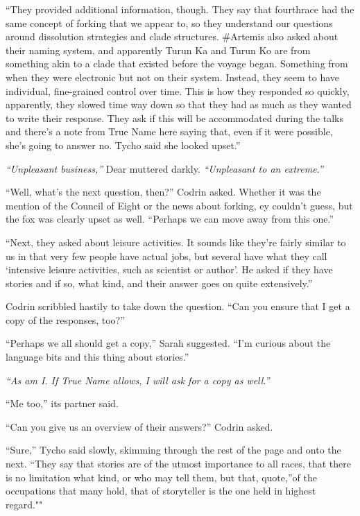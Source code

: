 ``They provided additional information, though. They say that fourthrace had the same concept of forking that we appear to, so they understand our questions around dissolution strategies and clade structures. \#Artemis also asked about their naming system, and apparently Turun Ka and Turun Ko are from something akin to a clade that existed before the voyage began. Something from when they were electronic but not on their system. Instead, they seem to have individual, fine-grained control over time. This is how they responded so quickly, apparently, they slowed time way down so that they had as much as they wanted to write their response. They ask if this will be accommodated during the talks and there's a note from True Name here saying that, even if it were possible, she's going to answer no. Tycho said she looked upset.''

\emph{``Unpleasant business,''} Dear muttered darkly. \emph{``Unpleasant to an extreme.''}

``Well, what's the next question, then?'' Codrin asked. Whether it was the mention of the Council of Eight or the news about forking, ey couldn't guess, but the fox was clearly upset as well. ``Perhaps we can move away from this one.''

``Next, they asked about leisure activities. It sounds like they're fairly similar to us in that very few people have actual jobs, but several have what they call `intensive leisure activities, such as scientist or author'. He asked if they have stories and if so, what kind, and their answer goes on quite extensively.''

Codrin scribbled hastily to take down the question. ``Can you ensure that I get a copy of the responses, too?''

``Perhaps we all should get a copy,'' Sarah suggested. ``I'm curious about the language bits and this thing about stories.''

\emph{``As am I. If True Name allows, I will ask for a copy as well.''}

``Me too,'' its partner said.

``Can you give us an overview of their answers?'' Codrin asked.

``Sure,'' Tycho said slowly, skimming through the rest of the page and onto the next. ``They say that stories are of the utmost importance to all races, that there is no limitation what kind, or who may tell them, but that, quote,''of the occupations that many hold, that of storyteller is the one held in highest regard.""

